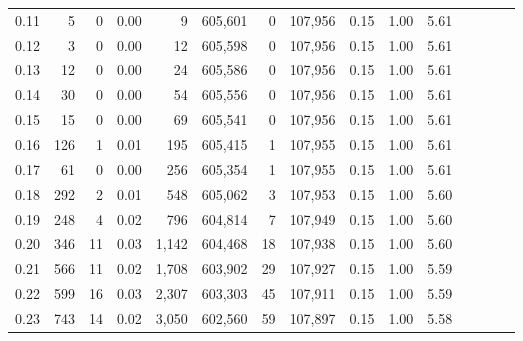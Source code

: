 \begin{tabular}{rrrcrrrrrrrrrrr}
0.11 &       5 &      0 &                                       0.00 &        9 &  605,601 &        0 &  107,956 &  0.15 &  1.00 &                         5.61 \\
0.12 &       3 &      0 &                                       0.00 &       12 &  605,598 &        0 &  107,956 &  0.15 &  1.00 &                         5.61 \\
0.13 &      12 &      0 &                                       0.00 &       24 &  605,586 &        0 &  107,956 &  0.15 &  1.00 &                         5.61 \\
0.14 &      30 &      0 &                                       0.00 &       54 &  605,556 &        0 &  107,956 &  0.15 &  1.00 &                         5.61 \\
0.15 &      15 &      0 &                                       0.00 &       69 &  605,541 &        0 &  107,956 &  0.15 &  1.00 &                         5.61 \\
0.16 &     126 &      1 &                                       0.01 &      195 &  605,415 &        1 &  107,955 &  0.15 &  1.00 &                         5.61 \\
0.17 &      61 &      0 &                                       0.00 &      256 &  605,354 &        1 &  107,955 &  0.15 &  1.00 &                         5.61 \\
0.18 &     292 &      2 &                                       0.01 &      548 &  605,062 &        3 &  107,953 &  0.15 &  1.00 &                         5.60 \\
0.19 &     248 &      4 &                                       0.02 &      796 &  604,814 &        7 &  107,949 &  0.15 &  1.00 &                         5.60 \\
0.20 &     346 &     11 &                                       0.03 &    1,142 &  604,468 &       18 &  107,938 &  0.15 &  1.00 &                         5.60 \\
0.21 &     566 &     11 &                                       0.02 &    1,708 &  603,902 &       29 &  107,927 &  0.15 &  1.00 &                         5.59 \\
0.22 &     599 &     16 &                                       0.03 &    2,307 &  603,303 &       45 &  107,911 &  0.15 &  1.00 &                         5.59 \\
0.23 &     743 &     14 &                                       0.02 &    3,050 &  602,560 &       59 &  107,897 &  0.15 &  1.00 &                         5.58 \\

\end{tabular}
